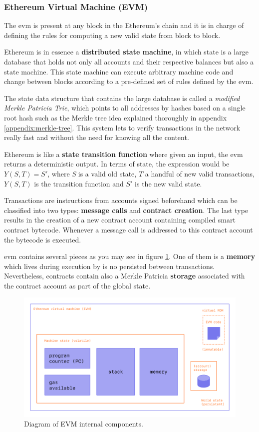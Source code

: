\subsubsection{Ethereum Virtual Machine (EVM)}
{The \acrlong{evm} is present at any block in the Ethereum's chain and it is in charge of defining the rules for computing a new valid state from block to block.

Ethereum is in essence a \textbf{distributed state machine}, in which state is a large database that holds not only all accounts and their respective balances but also a state machine. This state machine can execute arbitrary machine code and change between blocks according to a pre-defined set of rules defined by the \acrshort{evm}.

The state data structure that contains the large database is called a \textit{modified Merkle Patricia Trie}, which points to all addresses by hashes based on a single root hash such as the Merkle tree idea explained thoroughly in appendix \ref{appendix:merkle-tree}. This system lets to verify transactions in the network really fast and without the need for knowing all the content.

Ethereum is like a \textbf{state transition function} where given an input, the \acrshort{evm} returns a deterministic output. In terms of state, the expression would be \(Y(S, T)=S'\), where \textit{S} is a valid old state, \(T\) a handful of new valid transactions, \(Y(S, T)\) is the transition function and \(S'\) is the new valid state. 

Transactions are instructions from accounts signed beforehand which can be classified into two types: \textbf{message calls} and \textbf{contract creation}. The last type results in the creation of a new contract account containing compiled smart contract bytecode. Whenever a message call is addressed to this contract account the bytecode is executed.


\acrshort{evm} contains several pieces as you may see in figure \ref{fig:ethereum-node}. One of them is a \textbf{memory} which lives during execution by is no persisted between transactions. Nevertheless, contracts contain also a Merkle Patricia \textbf{storage} associated with the contract account as part of the global state. 

\begin{figure}[H]
\centering
\includegraphics[width=12cm]{img/ethereum/evm.png}
\caption[Diagram of EVM internal components]{\footnotesize{Diagram of EVM internal components.}}
\label{fig:ethereum-node}
\end{figure}

}
